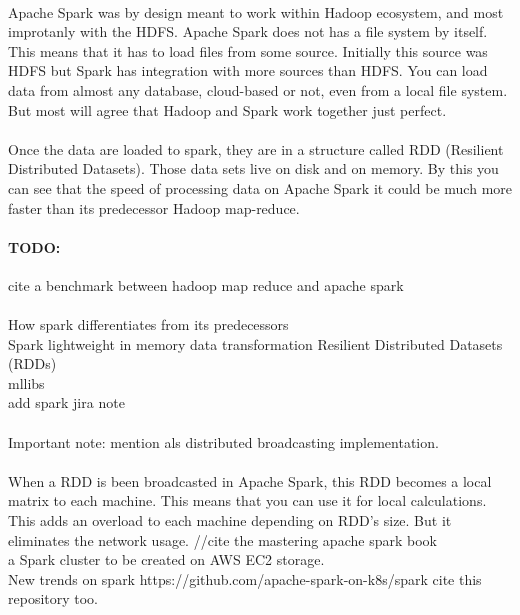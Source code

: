 \paragraph{}
Apache Spark was by design meant to work within Hadoop ecosystem, and most improtanly with the HDFS. Apache Spark does not has a file system by itself. This means that it has to load files from some source. Initially this source was HDFS but Spark has integration with more sources than HDFS. You can load data from almost any database, cloud-based or not, even from a local file system. But most will agree that Hadoop and Spark work together just perfect.

\paragraph{} Once the data are loaded to spark, they are in a structure called RDD (Resilient Distributed Datasets). Those data sets live on disk and on memory. By this you can see that the speed of processing data on Apache Spark it could be much more faster than its predecessor Hadoop map-reduce. 

\paragraph{TODO:} cite a benchmark between hadoop map reduce and apache spark

\paragraph{}
How spark differentiates from its predecessors\\
Spark lightweight in memory data transformation 
Resilient Distributed Datasets (RDDs) \\
mllibs\\
add spark jira note \\\\
Important note: mention als distributed broadcasting implementation. 
\\\\
When a RDD is been broadcasted in Apache Spark, this RDD becomes a local matrix to each machine. This means that you can use it for local calculations. This adds an overload to each machine depending on RDD's size. But it eliminates the network usage.
//cite the mastering apache spark book
\cite{ApacheSpark:1} \\
a Spark cluster to be created on AWS EC2 storage.\\
New trends on spark https://github.com/apache-spark-on-k8s/spark cite this repository too.
